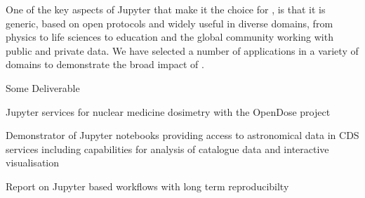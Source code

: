 \begin{workpackage}
\begin{wpdescription}
  One of the key aspects of Jupyter that make it the choice for
  \TheProject, is that it is generic, based on open protocols and
  widely useful in diverse domains, from physics to life sciences to
  education and the global community working with public and private
  data. We have selected a number of applications in a variety of domains
  to demonstrate the broad impact of \TheProject.

\end{wpdescription}

\begin{tasklist}
% 





\end{tasklist}



\begin{wpdelivs}
\begin{wpdeliv}[due=1,miles=startup,id=infrastructure,dissem=PU,nature=DEC,lead=SRL]
  {Some Deliverable}
\end{wpdeliv}
\begin{wpdeliv}[due=1,miles=startup,id=opendose-analysis,dissem=PU,nature=DEM,lead=INSERM]
  {Jupyter services for nuclear medicine dosimetry with the OpenDose project}
\end{wpdeliv}
\begin{wpdeliv}[due=1,miles=startup,id=application-astro,dissem=PU,nature=DEM,lead=CDS]
    {Demonstrator of Jupyter notebooks providing access to astronomical data in CDS services including capabilities for analysis of catalogue data and interactive visualisation}
\end{wpdeliv}
\begin{wpdeliv}[due=48,miles=startup,id=xfel-workflows,dissem=PU,nature=R,lead=XFEL]
  {Report on Jupyter based workflows with long term reproducibilty}
\end{wpdeliv}

\end{wpdelivs}
\end{workpackage}

